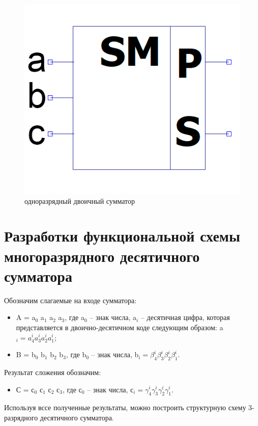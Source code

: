 \documentclass[a4paper,14pt]{article}
\begin{document}
\begin{figure}[H]
	\centering
	\includegraphics[width=0.4\linewidth]{images/dvSum_el}
	\caption{одноразрядный двоичный сумматор}
	\label{fig:dvSum_el2}
\end{figure}

\section{Разработки функциональной схемы многоразрядного десятичного сумматора}

Обозначим слагаемые на входе сумматора:

\begin{itemize}	
	\item A = a$_0$ a$_1$ a$_2$ a$_3$, где a$_0$ -- знак числа, a$_i$ -- десятичная цифра, которая представляется в двоично-десятичном коде следующим образом:
	a$_i = a^i_4 a^i_3 a^i_2 a^i_1$;
	
	\item B = b$_0$ b$_1$ b$_2$ b$_3$, где b$_0$ -- знак числа, b$_i = \beta^i_4 \beta^i_3 \beta^i_2 \beta^i_1$.	
\end{itemize}

Результат сложения обозначим:
\begin{itemize}	
	\item С = с$_0$ с$_1$ с$_2$ с$_3$, где с$_0$ -- знак числа, с$_i = \gamma^i_4 \gamma^i_3 \gamma^i_2 \gamma^i_1$.	
\end{itemize}

Используя вссе полученные результаты, можно построить структурную схему 3-разрядного десятичного сумматора.
\end{document}

